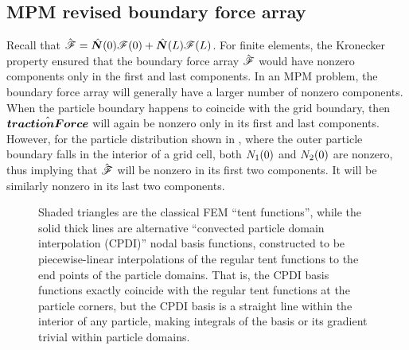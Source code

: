 
\subsection{MPM revised boundary force array}
Recall that $\hat{\bm{\mathscr{F}}}=\hat{\bm{N}}(0)\mathscr{F}(0)+\hat{\bm{N}}(L)\mathscr{F}(L)$.  For finite elements, the Kronecker property ensured that the boundary force array $\hat{\bm{\mathscr{F}}}$ would have nonzero components only in the first and last components. In an MPM problem, the boundary force array will generally have a larger number of nonzero components.  When the particle boundary happens to coincide with the grid boundary, then $\hat{\bm{tractionForce}}$ will again be nonzero only in its first and last components.  However, for the particle distribution shown in , where the outer particle boundary falls in the interior of a grid cell, both ${N}_1(0)$ and ${N}_2(0)$ are nonzero, thus implying that $\hat{\bm{\mathscr{F}}}$ will be nonzero in its first two components. It will be similarly nonzero in its last two components. 



\begin{figure}
\caption{Shaded triangles are the classical FEM ``tent functions'', while the solid thick lines are alternative ``convected particle domain interpolation (CPDI)'' nodal basis functions, constructed to be piecewise-linear interpolations of the regular tent functions to the end points of the particle domains. That is, the CPDI basis functions exactly coincide with the regular tent functions at the particle corners, but the CPDI basis is a straight line within the interior of any particle, making integrals of the basis or its gradient trivial within particle domains.}
\label{fig:CPDI_shape_functions}
\end{figure}

